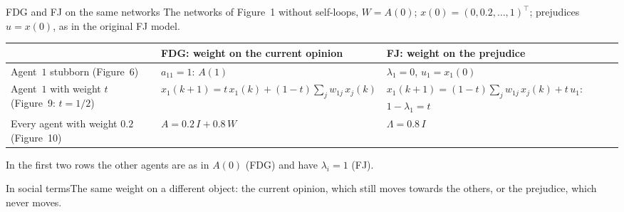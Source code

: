 \documentclass[10pt, aspectratio=169]{beamer}
\newcommand{\socially}[1]{%
  \begin{minipage}{0.76\textwidth}
    \begin{exampleblock}{In social terms}\footnotesize #1\end{exampleblock}
  \end{minipage}}
\begin{document}
\begin{frame}[label=m-fj-networks]{FDG and FJ on the same networks}
  \small
  The networks of Figure~1 without self-loops, $W = A(0)$;
  $x(0) = (0, 0.2, \dots, 1)^\top$; prejudices $u = x(0)$, as in the original FJ model.

  \medskip
  \scriptsize
  \renewcommand{\arraystretch}{1.6}
  \begin{tabular}{>{\raggedright\arraybackslash}p{}
                  >{\raggedright\arraybackslash}p{}
                  >{\raggedright\arraybackslash}p{}}
    \toprule
    & \textbf{FDG}: weight on the current opinion & \textbf{FJ}: weight on the prejudice \\
    \midrule
    Agent~$1$ stubborn (Figure~6) & $a_{11} = 1$: $A(1)$
      & $\lambda_1 = 0$, $u_1 = x_1(0)$ \\
    Agent~$1$ with weight $t$ (Figure~9: $t = 1/2$)
      & $x_1(k+1) = t\,x_1(k) + (1-t)\textstyle\sum_j w_{1j}\,x_j(k)$
      & $x_1(k+1) = (1-t)\textstyle\sum_j w_{1j}\,x_j(k) + t\,u_1$: $1 - \lambda_1 = t$ \\
    Every agent with weight $0.2$ (Figure~10)
      & $A = 0.2\,I + 0.8\,W$ & $\Lambda = 0.8\,I$ \\
    \bottomrule
  \end{tabular}

  \smallskip
  \footnotesize In the first two rows the other agents are as in $A(0)$ (FDG) and have
  $\lambda_i = 1$ (FJ).
  \socially{The same weight on a different object: the current opinion, which still moves
  towards the others, or the prejudice, which never moves.}
\end{frame}
\end{document}
